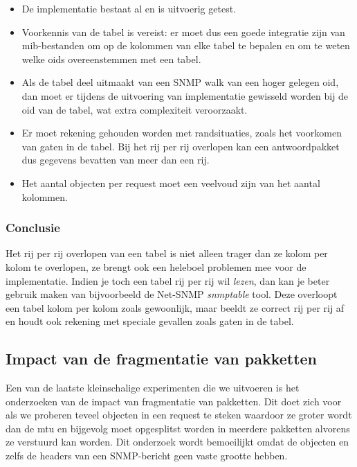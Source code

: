 \begin{itemize}
	\item De implementatie bestaat al en is uitvoerig getest.
	\item Voorkennis van de tabel is vereist: er moet dus een goede integratie zijn van \gls{mib}-bestanden
		om op de kolommen van elke tabel te bepalen en om te weten welke \glspl{oid} overeenstemmen met een tabel.
	\item Als de tabel deel uitmaakt van een SNMP walk van een hoger gelegen \gls{oid},
		dan moet er tijdens de uitvoering van implementatie gewisseld worden bij de \gls{oid} van de tabel, wat extra complexiteit veroorzaakt.
	\item Er moet rekening gehouden worden met randsituaties, zoals het voorkomen van gaten in de tabel\cite{net-snmp-table-holes}.
		Bij het rij per rij overlopen kan een antwoordpakket dus gegevens bevatten van meer dan een rij.
	\item Het aantal objecten per request moet een veelvoud zijn van het aantal kolommen.
\end{itemize}

\subsubsection{Conclusie}

Het rij per rij overlopen van een tabel is niet alleen trager dan ze kolom per kolom te overlopen,
ze brengt ook een heleboel problemen mee voor de implementatie.
Indien je toch een tabel rij per rij wil \textit{lezen}, dan kan je beter gebruik maken van bijvoorbeeld de Net-SNMP \textit{snmptable} tool.
Deze overloopt een tabel kolom per kolom zoals gewoonlijk, maar beeldt ze correct rij per rij af en houdt ook rekening met speciale gevallen zoals gaten in de tabel.


\subsection{Impact van de fragmentatie van pakketten}

Een van de laatste kleinschalige experimenten die we uitvoeren is het onderzoeken van de impact van fragmentatie van pakketten.
Dit doet zich voor als we proberen teveel objecten in een request te steken waardoor ze groter wordt dan de \gls{mtu} en
bijgevolg moet opgesplitst worden in meerdere pakketten alvorens ze verstuurd kan worden.
Dit onderzoek wordt bemoeilijkt omdat de objecten en zelfs de headers van een SNMP-bericht geen vaste grootte hebben.

